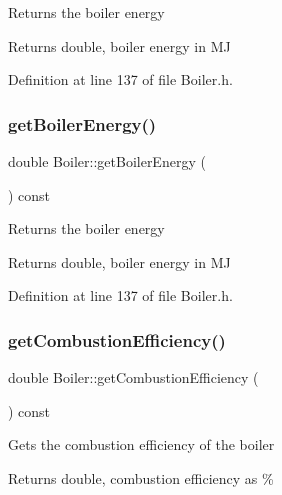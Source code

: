 Returns the boiler energy \begin{DoxyReturn}{Returns}
double, boiler energy in MJ 
\end{DoxyReturn}


Definition at line 137 of file Boiler.\+h.

\mbox{\label{class_boiler_a8cc9ad5f1b36f5dcbcb225e9e3d13a39}} 
\subsubsection{\texorpdfstring{get\+Boiler\+Energy()}{getBoilerEnergy()}\hspace{0.1cm}{\footnotesize\ttfamily [3/3]}}
{\footnotesize\ttfamily double Boiler\+::get\+Boiler\+Energy (\begin{DoxyParamCaption}{ }\end{DoxyParamCaption}) const\hspace{0.3cm}{\ttfamily [inline]}}

Returns the boiler energy \begin{DoxyReturn}{Returns}
double, boiler energy in MJ 
\end{DoxyReturn}


Definition at line 137 of file Boiler.\+h.

\mbox{\label{class_boiler_a21c7423b756761c3216704b3f554feff}} 
\subsubsection{\texorpdfstring{get\+Combustion\+Efficiency()}{getCombustionEfficiency()}\hspace{0.1cm}{\footnotesize\ttfamily [1/3]}}
{\footnotesize\ttfamily double Boiler\+::get\+Combustion\+Efficiency (\begin{DoxyParamCaption}{ }\end{DoxyParamCaption}) const}

Gets the combustion efficiency of the boiler \begin{DoxyReturn}{Returns}
double, combustion efficiency as \% 
\end{DoxyReturn}


